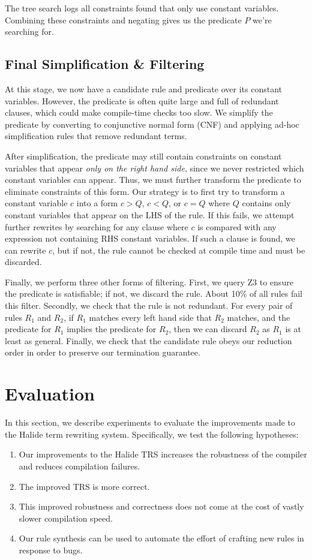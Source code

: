 \documentclass[sigplan,10pt,review,anonymous]{acmart}\settopmatter{printfolios=true,printccs=false,printacmref=false}
\begin{document}
The tree search logs all constraints found that only use constant variables.  Combining
these constraints and negating gives us the predicate $P$ we're searching for.

\subsection{Final Simplification \& Filtering} At this stage, we now have a candidate
rule and predicate over its constant variables.  However, the predicate is often quite
large and full of redundant clauses, which could make compile-time checks too slow.
We simplify the predicate by converting to conjunctive normal form (CNF) and applying
ad-hoc simplification rules that remove redundant terms.

After simplification, the predicate may still contain constraints on constant variables
that appear \textit{only on the right hand side}, since we never restricted which constant
variables can appear.  Thus, we must further transform the predicate to eliminate
constraints of this form.  Our strategy is to first try to transform a constant variable
$c$ into a form $c > Q$, $c < Q$, or $c = Q$ where $Q$ contains only constant variables
that appear on the LHS of the rule.  If this fails, we attempt further rewrites by
searching for any clause where $c$ is compared with any expression not containing RHS
constant variables.  If such a clause is found, we can rewrite $c$, but if not, the rule
cannot be checked at compile time and must be discarded.

Finally, we perform three other forms of filtering.  First, we query Z3 to ensure the
predicate is satisfiable; if not, we discard the rule.  About 10\% of all rules fail
this filter.  Secondly, we check that the rule is not redundant.  For every pair of
rules $R_1$ and $R_2$, if $R_1$ matches every left hand side that $R_2$ matches,
and the predicate for $R_1$ implies the predicate for $R_2$, then we can discard $R_2$
as $R_1$ is at least as general. Finally, we check that the candidate rule obeys our
reduction order in order to preserve our termination guarantee.


\section{Evaluation}
In this section, we describe experiments to evaluate the improvements made to the Halide term rewriting system.  Specifically, we
test the following hypotheses:
\begin{enumerate}
\item Our improvements to the Halide TRS increases the robustness of the compiler and reduces compilation failures.
\item The improved TRS is more correct.
\item This improved robustness and correctness does not come at the cost of vastly slower compilation speed.
\item Our rule synthesis can be used to automate the effort of crafting new rules in response to bugs.
\end{enumerate}
\end{document}

